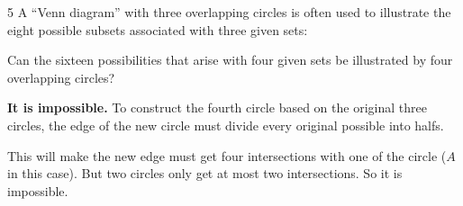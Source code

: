 \documentclass[a4paper,12pt]{article}
\makeatletter
\newtheorem*{solution}{Solution}
\theoremstyle{definition}
\renewenvironment{solution}[1][Solution] {\par\pushQED{\qed}\normalfont\topsep6\p@\@plus6\p@\relax\trivlist\item[\hskip\labelsep\bfseries#1\@addpunct{.}]\ignorespaces}{\popQED\endtrivlist\@endpefalse} \makeatother
\newenvironment{problems}{\begin{list}{}{\renewcommand{\makelabel}[1]{\textbf{##1}\hfil}}}{\end{list}}
\makeatother
\begin{document}
\begin{problems}
    \item[5] A ``Venn diagram'' with three overlapping circles is often used to illustrate the eight possible subsets associated with three given sets:

    

    Can the sixteen possibilities that arise with four given sets be illustrated by four overlapping circles?

    \begin{solution}
        \textbf{It is impossible.} To construct the fourth circle based on the original three circles, the edge of the new circle must divide every original possible into halfs.

        

        This will make the new edge must get four intersections with one of the circle ($A$ in this case). But two circles only get at most two intersections. So it is impossible.
    \end{solution}

\end{problems}
\end{document}
